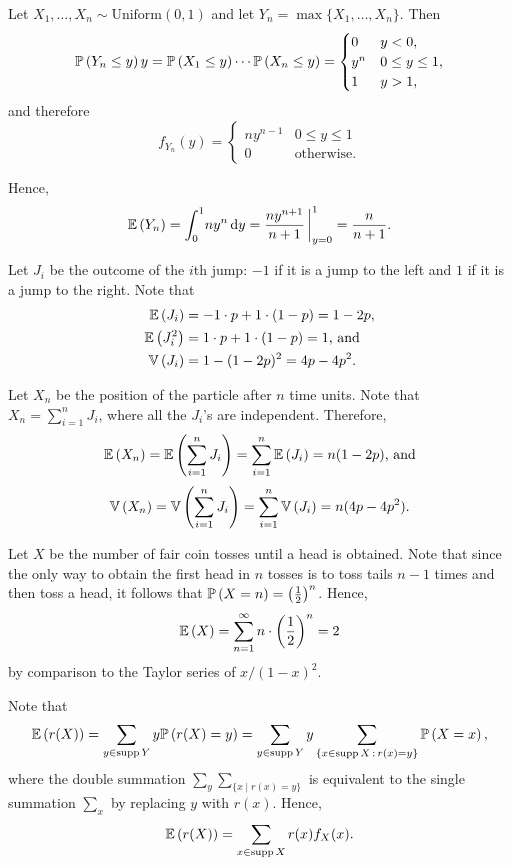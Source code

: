 \begin{ex}
  Let $X_1,\ldots,X_n\sim\text{Uniform}(0, 1)$ and let
  $Y_n=\max\{X_1,\ldots,X_n\}$. Then
  \[
    \P{Y_n\leq y}y
    =\P{X_1\leq y}\cdots \P{X_n\leq y}
    =\begin{cases}
      0   & y<0,          \\
      y^n & 0\leq y\leq1, \\
      1   & y>1,
    \end{cases}
  \]
  and therefore
  \[
    f_{Y_n}(y)=\begin{cases}
      ny^{n-1} & 0\leq y\leq1      \\
      0        & \text{otherwise}.
    \end{cases}
  \]

  Hence,
  \[
    \E{Y_n}
    =\int_0^1\! ny^n\,\d{y}
    =\frac{n y^{n+1}}{n+1}\,\bigg\rvert_{y=0}^1
    =\frac{n}{n+1}.
  \]
\end{ex}

\begin{ex}
  Let $J_i$ be the outcome of the $i$th jump: $-1$ if it is a jump to the left
  and $1$ if it is a jump to the right. Note that
  \begin{align*}
    \E{J_i}   & =-1\cdot p+1\cdot (1-p)=1-2p,        \\
    \E{J_i^2} & =1\cdot p+1\cdot (1-p)=1\text{, and} \\
    \var{J_i} & =1-(1-2p)^2=4p-4p^2.
  \end{align*}

  Let $X_n$ be the position of the particle after $n$ time units. Note that
  $X_n=\sum_{i=1}^n J_i$, where all the $J_i$'s are independent. Therefore,
  \[
    \E{X_n}
    = \E{\sum_{i=1}^n J_i}
    = \sum_{i=1}^n \E{J_i}
    = n(1-2p) \text{, and}
  \]
  \[
    \var{X_n}
    = \var{\sum_{i=1}^n J_i}
    = \sum_{i=1}^n \var{J_i}
    = n(4p-4p^2).
  \]
\end{ex}

\begin{ex}
  Let $X$ be the number of fair coin tosses until a head is obtained. Note that
  since the only way to obtain the first head in $n$ tosses is to toss tails
  $n-1$ times and then toss a head, it follows that
  $\P{X=n}=\left(\frac{1}{2}\right)^n$.
  Hence,
  \[
    \E{X}
    = \sum_{n=1}^\infty n\cdot \left(\frac{1}{2}\right)^n
    = 2
  \]
  by comparison to the Taylor series of $x/(1-x)^2$.
\end{ex}

\begin{ex}
  Note that
  \[
    \E{r(X)}
    =\sum_{y\in\supp{Y}}y\P{r(X)=y}
    =\sum_{y\in\supp{Y}}y\sum_{\{x\in\supp{X}\mid r(x)=y\}}\P{X=x},
  \]
  where the double summation $\sum_y\sum_{\{x\mid r(x)=y\}}$ is equivalent to
  the single summation $\sum_{x}$ by replacing $y$ with $r(x)$. Hence,
  \[
    \E{r(X)}
    =\sum_{x\in\supp{X}}r(x)f_X(x).
  \]
\end{ex}

